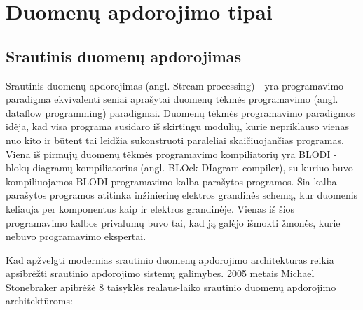\documentclass{VUMIFPSkursinis}
\begin{document}
\section{Duomenų apdorojimo tipai}

\subsection{Srautinis duomenų apdorojimas} \label{strprocess}

    Srautinis duomenų apdorojimas (angl. Stream processing) - yra programavimo paradigma ekvivalenti seniai aprašytai duomenų tėkmės programavimo (angl. dataflow programming) paradigmai\cite{shortstreamproc}. 
Duomenų tėkmės programavimo paradigmos idėja, kad visa programa susidaro iš skirtingu modulių, kurie nepriklauso vienas nuo kito ir būtent tai leidžia sukonstruoti paraleliai skaičiuojančias programas. 
Viena iš pirmųjų duomenų tėkmės programavimo kompiliatorių yra BLODI - blokų diagramų kompiliatorius (angl. BLOck DIagram compiler), su kuriuo buvo kompiliuojamos BLODI programavimo kalba parašytos programos. 
Šia kalba parašytos programos atitinka inžinierinę elektros grandinės schemą, kur duomenis keliauja per komponentus kaip ir elektros grandinėje. Vienas iš šios programavimo kalbos privalumų buvo tai, 
kad ją galėjo išmokti žmonės, kurie nebuvo programavimo ekspertai\cite{kelly1961block}.\par
Kad apžvelgti modernias srautinio duomenų apdorojimo architektūras reikia apsibrėžti srautinio apdorojimo sistemų galimybes.
2005 metais Michael Stonebraker apibrėžė 8 taisyklės realaus-laiko srautinio duomenų apdorojimo architektūroms\cite{stonebraker20058}:
\end{document}
